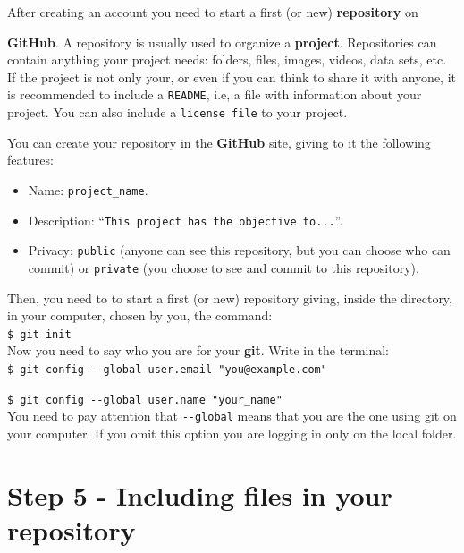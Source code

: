 \documentclass[12pt,a4paper,titlepage,brazil]{article}
\begin{document}
After creating an account you need to start a first (or new) {\bf repository} on {{\bf GitHub}. A repository is usually used to organize a {\bf project}. Repositories can contain anything your project needs: folders, files, images, videos, data sets, etc. If the project is not only your, or even if you can think to share it with anyone, it is recommended to include a \texttt{README}, i.e, a file with information about your project. You can also include a \texttt{license file} to your project.

You can create your repository in the {\bf GitHub} \href{https://github.com}{site}, giving to it the following features:
\begin{itemize}
 \item Name: \texttt{project\_name}.
 \item Description: ``\texttt{This project has the objective to...}''.
 \item Privacy: \texttt{public} (anyone can see this repository, but you can choose who can commit) or \texttt{private} (you choose to see and commit to this repository).
\end{itemize}
 
Then, you need to to start a first (or new) repository giving, inside the directory, in your computer, chosen by you, the command:\\

\texttt{\$ git init}\\

Now you need to say who you are for your {\bf git}. Write in the terminal:\\

\texttt{\$ git config -\hspace{0.01cm}-global user.email "you@example.com"}

\texttt{\$ git config -\hspace{0.01cm}-global user.name "your\_name"}\\

You need to pay attention that \texttt{-\hspace{0.01cm}-global} means that you are the one using git on your computer. If you omit this option you are logging in only on the local folder.


\section{Step 5 - Including files in your repository}

}
\end{document}

